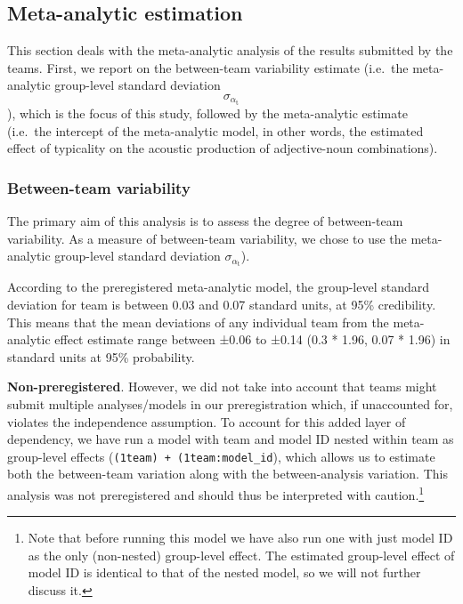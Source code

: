 \documentclass[Review,times,sageh]{sagej}
\begin{document}
\hypertarget{meta-analytic-estimation}{%
\subsection{Meta-analytic estimation}\label{meta-analytic-estimation}}

This section deals with the meta-analytic analysis of the results submitted by the teams.
First, we report on the between-team variability estimate (i.e.~the meta-analytic group-level standard deviation \[\sigma_{\alpha_{\text{t}}}\]), which is the focus of this study, followed by the meta-analytic estimate (i.e.~the intercept of the meta-analytic model, in other words, the estimated effect of typicality on the acoustic production of adjective-noun combinations).

\hypertarget{between-team-variability}{%
\subsubsection{Between-team variability}\label{between-team-variability}}

The primary aim of this analysis is to assess the degree of between-team variability.
As a measure of between-team variability, we chose to use the meta-analytic group-level standard deviation \(\sigma_{\alpha_{\text{t}}}\)).

According to the preregistered meta-analytic model, the group-level standard deviation for team is between 0.03 and 0.07 standard units, at 95\% credibility.
This means that the mean deviations of any individual team from the meta-analytic effect estimate range between ±0.06 to ±0.14 (0.3 * 1.96, 0.07 * 1.96) in standard units at 95\% probability.

\textbf{Non-preregistered}. However, we did not take into account that teams might submit multiple analyses/models in our preregistration which, if unaccounted for, violates the independence assumption.
To account for this added layer of dependency, we have run a model with team and model ID nested within team as group-level effects (\texttt{(1\textbar{}team)\ +\ (1\textbar{}team:model\_id}), which allows us to estimate both the between-team variation along with the between-analysis variation.
This analysis was not preregistered and should thus be interpreted with caution.\footnote{Note that before running this model we have also run one with just model ID as the only (non-nested) group-level effect. The estimated group-level effect of model ID is identical to that of the nested model, so we will not further discuss it.}
\end{document}
